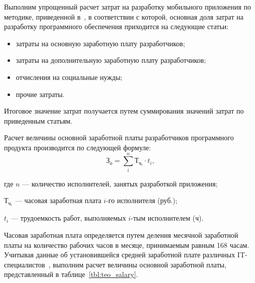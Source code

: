 Выполним упрощенный расчет затрат на разработку мобильного приложения
по методике, приведенной в~\cite{diploma_teo}, в соответствии с которой,
основная доля затрат на разработку программного обеспечения приходится
на следующие статьи:
\begin{itemize}
  \item затраты на основную заработную плату разработчиков;
  \item затраты на дополнительную заработную плату разработчиков;
  \item отчисления на социальные нужды;
  \item прочие затраты.
\end{itemize}

Итоговое значение затрат получается путем суммирования значений затрат
по приведенным статьям.

Расчет величины основной заработной платы разработчиков программного
продукта производится по следующей формуле:
\begin{equation*}
  \text{З}_{\text{о}} =
  \sum^n_i \text{Т}_{\text{ч}_{i}} \cdot t_{i},
\end{equation*}

\noindent где
\( n \)
--- количество исполнителей, занятых разработкой приложения; \par
\noindent \hspace{6.5mm} \( \text{Т}_{\text{ч}_{i}} \)
--- часовая заработная плата \( i \)-го исполнителя (руб.); \par
\noindent \hspace{6.5mm} \( t_i \)
--- трудоемкость работ, выполняемых \( i \)-тым исполнителем (ч).

Часовая заработная плата определяется путем деления месячной
заработной платы на количество рабочих часов в месяце,
принимаемым равным 168 часам.
Учитывая данные об установившейся средней заработной
плате различных IT-специалистов~\cite{dev_by_salaries},
выполним расчет величины основной заработной платы,
представленный в таблице~\ref{tbl:teo_salary}.

